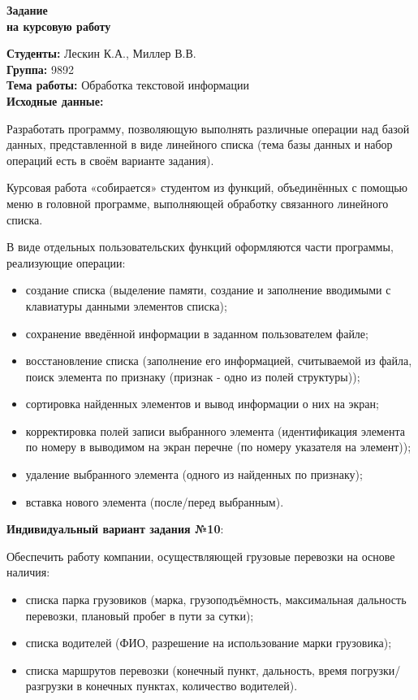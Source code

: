 \begin{center}
	\Large{
		\textbf{Задание\\ на курсовую работу}
	}
\end{center}

\textbf{Студенты:} Лескин К.А., Миллер В.В.\\

\textbf{Группа:} 9892\\

\textbf{Тема работы:} Обработка текстовой информации\\

\textbf{Исходные данные:}

Разработать программу, позволяющую выполнять различные операции
над базой данных, представленной в виде линейного списка (тема базы
данных и набор операций есть в своём варианте задания).

Курсовая работа «собирается» студентом из функций, объединённых с
помощью меню в головной программе, выполняющей обработку связанного
линейного списка.

В виде отдельных пользовательских функций оформляются части
программы, реализующие операции:
\begin{itemize}
	\item создание списка (выделение памяти, создание и заполнение вводимыми с
	клавиатуры данными элементов списка);
	\item сохранение введённой информации в заданном пользователем файле;
	\item восстановление списка (заполнение его информацией, считываемой из
	файла, поиск элемента по признаку (признак - одно из полей структуры));
	\item сортировка найденных элементов и вывод информации о них на экран;
	\item корректировка полей записи выбранного элемента (идентификация
	элемента по номеру в выводимом на экран перечне (по номеру указателя
	на элемент));
	\item удаление выбранного элемента (одного из найденных по признаку);
	\item вставка нового элемента (после/перед выбранным).
\end{itemize}

\newpage

\textbf{Индивидуальный вариант задания №10}:

Обеспечить работу компании, осуществляющей грузовые
перевозки на основе наличия:

\begin{itemize}
	\item списка парка грузовиков (марка, грузоподъёмность, максимальная
	дальность перевозки, плановый пробег в пути за сутки);
	\item списка водителей (ФИО, разрешение на использование марки грузовика);
	\item списка маршрутов перевозки (конечный пункт, дальность, время
	погрузки/разгрузки в конечных пунктах, количество водителей).
\end{itemize}

